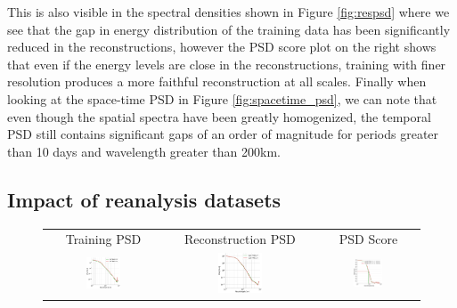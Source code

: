 \begin{bibunit}
This is also visible in the spectral densities shown in Figure \ref{fig:respsd} where we see that the gap in energy distribution of the training data has been significantly reduced in the reconstructions, however the PSD score plot on the right shows that even if the energy levels are close in the reconstructions, training with finer resolution produces a more faithful reconstruction at all scales.
Finally when looking at the space-time PSD in Figure \ref{fig:spacetime_psd}, we can note that even though the spatial spectra have been greatly homogenized, the temporal PSD still contains significant gaps of an order of magnitude for periods greater than 10 days and wavelength greater than 200km.

\subsection{Impact of reanalysis datasets}
\label{ssec:reanalysis}
\begin{figure}[h]

\small

\setlength{\tabcolsep}{1pt}
\begin{tabular}{ccc}

\hspace{3mm} Training PSD & 
\hspace{3mm} Reconstruction PSD & 
\hspace{3mm} PSD Score  \\


\includegraphics[width=0.31\textwidth]{00_Simulearning/figures/plots2/isotrop_psd_rea_train.png} &
\includegraphics[width=0.31\textwidth]{00_Simulearning/figures/plots2/isotrop_psd_rea_rec.png} &
\includegraphics[width=0.31\textwidth]{00_Simulearning/figures/plots2/rea_1d_psd_score.png}



\end{tabular}
\end{figure}
\end{bibunit}
